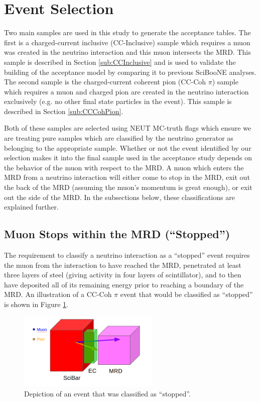 \documentclass[11pt]{article}
\begin{document}
\section{Event Selection}
\label{sec:eventselection}
Two main samples are used in this study to generate the acceptance tables. The first is a charged-current inclusive (CC-Inclusive) sample which requires a muon was created in the neutrino interaction and this muon intersects the MRD. This sample is described in Section \ref*{sub:CCInclusive} and is used to validate the building of the acceptance model by comparing it to previous SciBooNE analyses. The second sample is the charged-current coherent pion (CC-Coh $\pi$) sample which requires a muon and charged pion are created in the neutrino interaction exclusively (e.g. no other final state particles in the event). This sample is described in Section \ref*{sub:CCCohPion}.

Both of these samples are selected using NEUT MC-truth flags which ensure we are treating pure samples which are classified by the neutrino generator as belonging to the appropriate sample. Whether or not the event identified by our selection makes it into the final sample used in the acceptance study depends on the behavior of the muon with respect to the MRD. A muon which enters the MRD from a neutrino interaction will either come to stop in the MRD, exit out the back of the MRD (assuming the muon's momentum is great enough), or exit out the side of the MRD. In the subsections below, these classifications are explained further.

\subsection{Muon Stops within the MRD (``Stopped'')}
\label{sub:stoppedMRD}
The requirement to classify a neutrino interaction as a ``stopped'' event requires the muon from the interaction to have reached the MRD, penetrated at least three layers of steel (giving activity in four layers of scintillator), and to then have deposited all of its remaining energy prior to reaching a boundary of the MRD. An illustration of a CC-Coh $\pi$ event that would be classified as ``stopped'' is shown in Figure \ref*{fig:stoppedEvent}.

\begin{figure}[H]
\centering
\includegraphics[width=0.6\textwidth]{EventClassifications/StoppedNew.png}
\caption{Depiction of an event that was classified as ``stopped''.}
\label{fig:stoppedEvent}
\end{figure}
\end{document}
